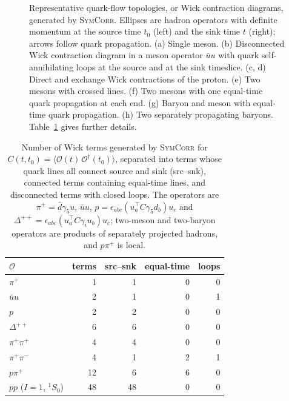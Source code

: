 \documentclass[a4paper,fleqn]{cas-dc}
\begin{document}
\begin{figure}[pos=!tbp]
\caption{Representative quark-flow topologies, or Wick contraction diagrams, generated by \textsc{SymCorr}. Ellipses are hadron operators with definite momentum at the source time $t_0$ (left) and the sink time $t$ (right); arrows follow quark propagation. (a) Single meson. (b) Disconnected Wick contraction diagram in a meson operator $\bar uu$ with quark self-annihilating loops at the source and at the sink timeslice. (c, d) Direct and exchange Wick contractions of the proton. (e) Two mesons with crossed lines. (f) Two mesons with one equal-time quark propagation at each end. (g) Baryon and meson with equal-time quark propagation. (h) Two separately propagating baryons. Table~\ref{tab:topology_counts} gives further details.}
\label{fig:topologies}
\end{figure}

\begin{table}[tbp]
\centering
\caption{Number of Wick terms generated by \textsc{SymCorr} for $C(t,t_0)=\langle\mathcal O(t)\,\mathcal O^\dagger(t_0)\rangle$, separated into terms whose quark lines all connect source and sink (src--snk), connected terms containing equal-time lines, and disconnected terms with closed loops. The operators are $\pi^+=\bar d\gamma_5 u$, $\bar u u$, $p=\epsilon_{abc}(u_a^\top C\gamma_5 d_b)u_c$ and $\Delta^{++}=\epsilon_{abc}(u_a^\top C\gamma_i u_b)u_c$; two-meson and two-baryon operators are products of separately projected hadrons, and $p\pi^+$ is local.}
\label{tab:topology_counts}
\small
\setlength{\tabcolsep}{5pt}
\begin{tabular}{lrrrr}
\toprule
$\mathcal O$ & terms & src--snk & equal-time & loops \\
\midrule
$\pi^+$ & 1 & 1 & 0 & 0 \\
$\bar u u$ & 2 & 1 & 0 & 1 \\
$p$ & 2 & 2 & 0 & 0 \\
$\Delta^{++}$ & 6 & 6 & 0 & 0 \\
$\pi^+\pi^+$ & 4 & 4 & 0 & 0 \\
$\pi^+\pi^-$ & 4 & 1 & 2 & 1 \\
$p\pi^+$ & 12 & 6 & 6 & 0 \\
$pp$ ($I{=}1$, ${}^1S_0$) & 48 & 48 & 0 & 0 \\
\bottomrule
\end{tabular}
\end{table}
\end{document}
